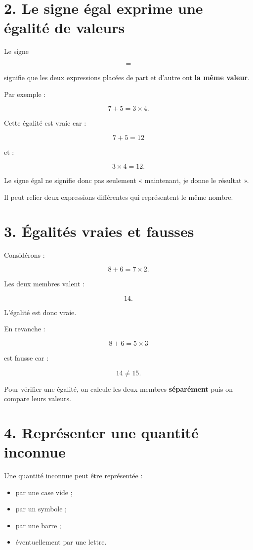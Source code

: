 \section{2. Le signe égal exprime une égalité de valeurs}

Le signe

\[
=
\]

signifie que les deux expressions placées de part et d’autre ont \textbf{la même valeur}.

Par exemple :

\[
7+5=3\times4.
\]

Cette égalité est vraie car :

\[
7+5=12
\]

et :

\[
3\times4=12.
\]

Le signe égal ne signifie donc pas seulement « maintenant, je donne le résultat ».

Il peut relier deux expressions différentes qui représentent le même nombre.

\section{3. Égalités vraies et fausses}

Considérons :

\[
8+6=7\times2.
\]

Les deux membres valent :

\[
14.
\]

L’égalité est donc vraie.

En revanche :

\[
8+6=5\times3
\]

est fausse car :

\[
14\neq15.
\]

Pour vérifier une égalité, on calcule les deux membres \textbf{séparément} puis on compare leurs valeurs.

\section{4. Représenter une quantité inconnue}

Une quantité inconnue peut être représentée :

\begin{itemize}
\item par une case vide ;
\item par un symbole ;
\item par une barre ;
\item éventuellement par une lettre.
\end{itemize}


